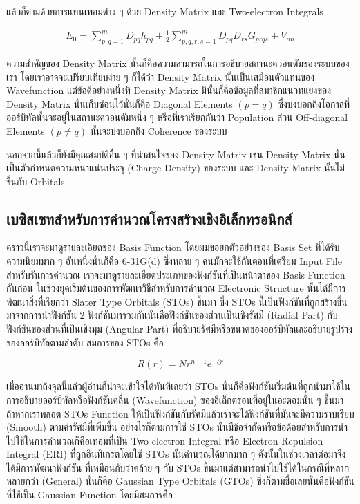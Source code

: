 \noindent แล้วก็ตามด้วยการแทนเทอมต่าง ๆ ด้วย Density Matrix และ Two-electron Integrals

\begin{equation}
    \begin{aligned}
        E_0
        =
        \sum_{p, q=1}^m D_{p q} h_{p q}
        + \frac{1}{2} \sum_{p, q, r, s=1}^m D_{p q} D_{r s} G_{p r q s}+V_{n n}
    \end{aligned}
\end{equation}

ความสำคัญของ Density Matrix นั้นก็คือความสามารถในการอธิบายสถานะควอนตัมของระบบของเรา โดยเราอาจจะเปรียบเทียบง่าย ๆ ก็ได้ว่า
Density Matrix นั้นเป็นเสมือนตัวแทนของ Wavefunction แต่ข้อดีอย่างหนึ่งที่ Density Matrix มีนั้นก็คือข้อมูลที่สมาชิกแนวทแยงของ
Density Matrix นั้นเก็บซ่อนไว้นั่นก็คือ Diagonal Elements $(p = q)$ ซึ่งบ่งบอกถึงโอกาสที่ออร์บิทัลนั้นจะอยู่ในสถานะควอนตัมหนึ่ง ๆ
หรือที่เราเรียกกันว่า Population ส่วน Off-diagonal Elements $(p \neq q)$ นั้นจะบ่งบอกถึง Coherence ของระบบ

นอกจากนี้แล้วก็ยังมีคุณสมบัติอื่น ๆ ที่น่าสนใจของ Density Matrix เช่น Density Matrix นั้นเป็นตัวกำหนดความหนาแน่นประจุ (Charge
Density) ของระบบ และ Density Matrix นั้นไม่ขึ้นกับ Orbitals

\subsection{เบซิสเซทสำหรับการคำนวณโครงสร้างเชิงอิเล็กทรอนิกส์}

คราวนี้เราจะมาดูรายละเอียดของ Basis Function โดยผมขอยกตัวอย่างของ Basis Set ที่ได้รับความนิยมมาก ๆ อันหนึ่งนั่นก็คือ 6-31G(d)
ซึ่งหลาย ๆ คนมักจะใช้กันตอนที่เตรียม Input File สำหรับรันการคำนวณ เราจะมาดูรายละเอียดประเภทของฟังก์ชันที่เป็นหน้าตาของ Basis Function
กันก่อน ในช่วงยุคเริ่มต้นของการพัฒนาวิธีสำหรับการคำนวณ Electronic Structure นั้นได้มีการพัฒนาสิ่งที่เรียกว่า Slater Type Orbitals
(STOs) ขึ้นมา ซึ่ง STOs นี้เป็นฟังก์ชันที่ถูกสร้างขึ้นมาจากการนำฟังก์ชัน 2 ฟังก์ชันมารวมกันนั่นคือฟังก์ชันของส่วนเป็นเชิงรัศมี (Radial Part)
กับฟังก์ชันของส่วนที่เป็นเชิงมุม (Angular Part) ที่อธิบายรัศมีหรือขนาดของออร์บิทัลและอธิบายรูปร่างของออร์บิทัลตามลำดับ สมการของ STOs คือ

\begin{equation}
    \label{eq:sto}
    R(r) = N r^{n - 1} e^{-\zeta r}
\end{equation}

เมื่ออ่านมาถึงจุดนี้แล้วผู้อ่านก็น่าจะเข้าใจได้ทันทีเลยว่า STOs นั้นก็คือฟังก์ชันเริ่มต้นที่ถูกนำมาใช้ในการอธิบายออร์บิทัลหรือฟังก์ชันคลื่น (Wavefunction)
ของอิเล็กตรอนที่อยู่ในอะตอมนั้น ๆ ขึ้นมา ถ้าหากเราพลอต STOs Function ให้เป็นฟังก์ชันกับรัศมีแล้วเราจะได้ฟังก์ชันที่มันจะมีความราบเรียบ (Smooth)
ตามค่ารัศมีที่เพิ่มขึ้น อย่างไรก็ตามการใช้ STOs นั้นมีข้อจำกัดหรือข้อด้อยสำหรับการนำไปใช้ในการคำนวณก็คือเทอมที่เป็น Two-electron Integral
หรือ Electron Repulsion Integral (ERI) ที่ถูกอินทิเกรตโดยใช้ STOs นั้นคำนวณได้ยากมาก ๆ ดังนั้นในช่วงเวลาต่อมาจึงได้มีการพัฒนาฟังก์ชัน%
ที่เหมือนกับว่าคล้าย ๆ กับ STOs ขึ้นมาแต่สามารถนำไปใช้ได้ในกรณีที่หลากหลายกว่า (General) นั่นก็คือ Gaussian Type Orbitals (GTOs)
ซึ่งก็ตามชื่อเลยนั่นคือฟังก์ชันที่ใช้เป็น Gaussian Function โดยมีสมการคือ

